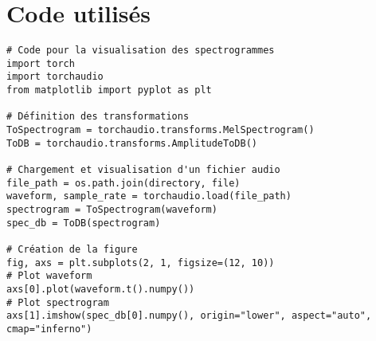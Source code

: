 \documentclass[11pt,a4paper]{article}
\begin{document}
\appendix
\section{Code utilisés}
\label{app:code}

\begin{lstlisting}
# Code pour la visualisation des spectrogrammes
import torch
import torchaudio
from matplotlib import pyplot as plt

# Définition des transformations
ToSpectrogram = torchaudio.transforms.MelSpectrogram()
ToDB = torchaudio.transforms.AmplitudeToDB()

# Chargement et visualisation d'un fichier audio
file_path = os.path.join(directory, file)
waveform, sample_rate = torchaudio.load(file_path)
spectrogram = ToSpectrogram(waveform)
spec_db = ToDB(spectrogram)

# Création de la figure
fig, axs = plt.subplots(2, 1, figsize=(12, 10))
# Plot waveform
axs[0].plot(waveform.t().numpy())
# Plot spectrogram
axs[1].imshow(spec_db[0].numpy(), origin="lower", aspect="auto", cmap="inferno")
\end{lstlisting}
\end{document}
